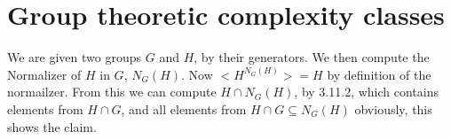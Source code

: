 \section{Group theoretic complexity classes}

We are given two groups $G$ and $H$, by their generators. We then compute the Normalizer of $H$ in $G$, $N_G(H)$. Now $<H^{N_G(H)}>=H$ by definition of the normailzer. From this we can compute $H \cap N_G(H)$, by 3.11.2, which contains elements from $H \cap G$, and all elements from $H \cap G \subseteq N_G(H)$ obviously, this shows the claim.

